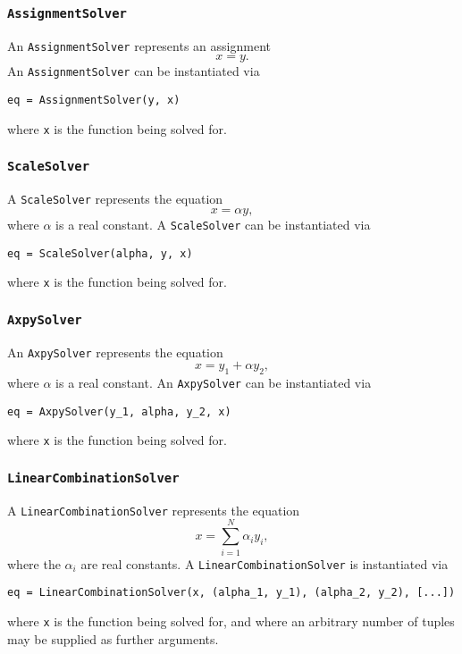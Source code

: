 \documentclass[11pt]{article}
\begin{document}
\subsubsection{\texttt{AssignmentSolver}}

An \texttt{AssignmentSolver} represents an assignment
\begin{equation*}
  x = y.
\end{equation*}
An \texttt{AssignmentSolver} can be instantiated via
\begin{lstlisting}
eq = AssignmentSolver(y, x)
\end{lstlisting}
where \texttt{x} is the function being solved for.

\subsubsection{\texttt{ScaleSolver}}

A \texttt{ScaleSolver} represents the equation
\begin{equation*}
  x = \alpha y,
\end{equation*}
where $\alpha$ is a real constant. A \texttt{ScaleSolver} can be instantiated
via
\begin{lstlisting}
eq = ScaleSolver(alpha, y, x)
\end{lstlisting}
where \texttt{x} is the function being solved for.

\subsubsection{\texttt{AxpySolver}}

An \texttt{AxpySolver} represents the equation
\begin{equation*}
  x = y_1 + \alpha y_2,
\end{equation*}
where $\alpha$ is a real constant. An \texttt{AxpySolver} can be instantiated
via
\begin{lstlisting}
eq = AxpySolver(y_1, alpha, y_2, x)
\end{lstlisting}
where \texttt{x} is the function being solved for.

\subsubsection{\texttt{LinearCombinationSolver}}

A \texttt{LinearCombinationSolver} represents the equation
\begin{equation*}
  x = \sum_{i = 1}^N \alpha_i y_i,
\end{equation*}
where the $\alpha_i$ are real constants. A \texttt{LinearCombinationSolver} is
instantiated via
\begin{lstlisting}
eq = LinearCombinationSolver(x, (alpha_1, y_1), (alpha_2, y_2), [...])
\end{lstlisting}
where \texttt{x} is the function being solved for, and where an arbitrary
number of tuples may be supplied as further arguments.
\end{document}
